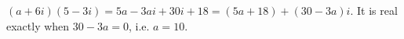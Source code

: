 $(a+6i)(5-3i)=5a-3ai+30i+18=(5a+18)+(30-3a)i$. It is real exactly when $30-3a=0$, i.e. $a=\boxed{10}$.
